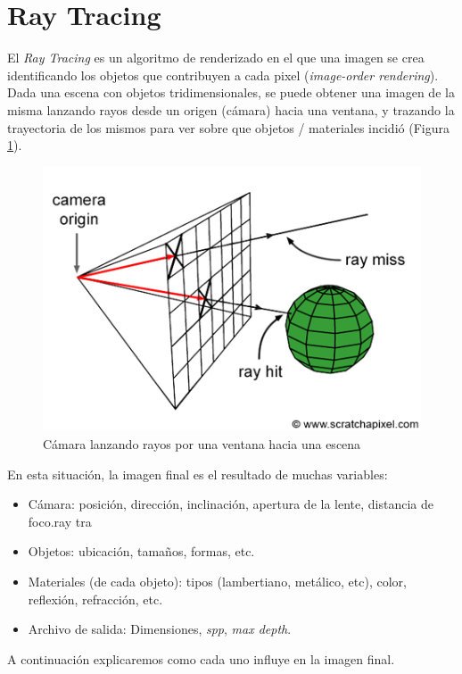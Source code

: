 \section{Ray Tracing} \label{sec:ray-tracing}

El \textit{Ray Tracing} es un algoritmo de renderizado en el que una imagen se
crea identificando los objetos que contribuyen a cada pixel (\textit{image-order
rendering}). Dada una escena con objetos tridimensionales, se puede obtener una
imagen de la misma lanzando rayos desde un origen (cámara) hacia una ventana, y
trazando la trayectoria de los mismos para ver sobre que objetos / materiales
incidió (Figura \ref{fig:rt-camera-throwing-rays-into-scene}).

\begin{figure}
    \centering
    \includegraphics[width=.7\textwidth]{imgs/rt-camera-throwing-rays-into-scene.png}
    \caption{Cámara lanzando rayos por una ventana hacia una escena}
    \label{fig:rt-camera-throwing-rays-into-scene}
\end{figure}

En esta situación, la imagen final es el resultado de muchas variables:

\begin{itemize}
    \item Cámara: posición, dirección, inclinación, apertura de la lente,
        distancia de foco.ray tra
    \item Objetos: ubicación, tamaños, formas, etc.
    \item Materiales (de cada objeto): tipos (lambertiano, metálico, etc),
    color, reflexión, refracción, etc.
    \item Archivo de salida: Dimensiones, \textit{spp}, \textit{max depth}.
\end{itemize}

A continuación explicaremos como cada uno influye en la imagen final.

